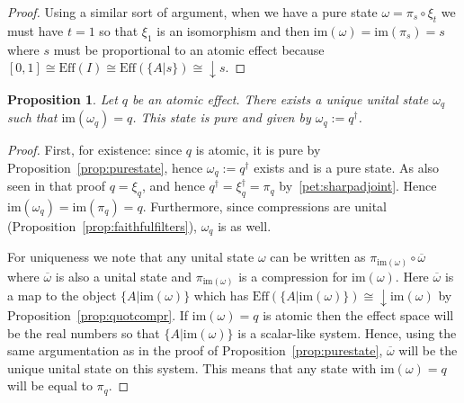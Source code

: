 \documentclass[a4paper,onecolumn,10pt,accepted=2019-05-03, issue=1, volume=1, shorttitle=papers/compositionality-1-1]{compositionalityarticle}
\newcounter{counter}
\numberwithin{counter}{section}
\newtheorem{proposition}[counter]{Proposition}
\newtheorem{corollary}[counter]{Corollary}
\newcommand{\asrt}{\text{asrt}}
\newcommand{\pred}{\text{Eff}}
\newcommand{\cl}[1]{\overline{#1}}
\newcommand{\im}[1]{\text{im}(#1)}
\begin{document}
\begin{proof}
	Using a similar sort of argument, when we have a pure state $\omega=\pi_s\circ \xi_t$ we must have $t=1$ so that $\xi_1$ is an isomorphism and then $\im{\omega}=\im{\pi_s}=s$ where $s$ must be proportional to an atomic effect because $[0,1]\cong \pred(I)\cong \pred(\{A\lvert s\}) \cong \downarrow s$.
\end{proof}

\begin{proposition} \label{prop:atomicstate}
	Let $q$ be an atomic effect. There exists a unique unital state $\omega_q$ such that $\im{\omega_q}=q$. This state is pure and given by $\omega_q:=q^\dagger$.
\end{proposition}
\begin{proof}
    First, for existence: since $q$ is atomic, it is pure by Proposition~\ref{prop:purestate}, hence $\omega_q:=q^\dagger$ exists and is a pure state. As also seen in that proof $q=\xi_q$, and hence $q^\dagger = \xi_q^\dagger = \pi_q$ by~\ref{pet:sharpadjoint}. Hence $\im{\omega_q}=\im{\pi_q} = q$. Furthermore, since compressions are unital (Proposition~\ref{prop:faithfulfilters}), $\omega_q$ is as well.

	For uniqueness we note that any unital state $\omega$ can be written as $\pi_{\im{\omega}}\circ \cl{\omega}$ where $\cl{\omega}$ is also a unital state and $\pi_{\im{\omega}}$ is a compression for $\im{\omega}$. Here $\cl{\omega}$ is a map to the object $\{A\lvert \im{\omega}\}$ which has $\pred(\{A\lvert \im{\omega}\}) \cong \downarrow \im{\omega}$ by Proposition~\ref{prop:quotcompr}. If $\im{\omega}=q$ is atomic then the effect space will be the real numbers so that $\{A\lvert \im{\omega}\}$ is a scalar-like system. Hence, using the same argumentation as in the proof of Proposition~\ref{prop:purestate}, $\cl{\omega}$ will be the unique unital state on this system. This means that any state with $\im{\omega}=q$ will be equal to $\pi_q$.
\end{proof}
\end{document}
